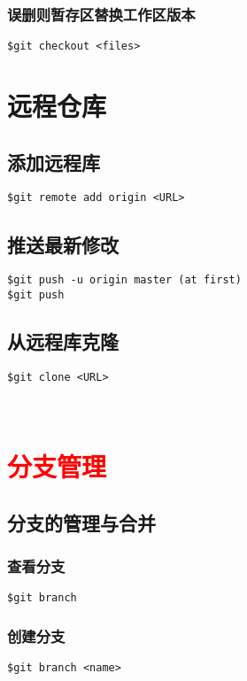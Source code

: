 \subsubsection{误删则暂存区替换工作区版本}
\begin{lstlisting}
$git checkout <files>
\end{lstlisting}

\section{远程仓库}
\subsection{添加远程库}
\begin{lstlisting}
$git remote add origin <URL>
\end{lstlisting}

\subsection{推送最新修改}
\begin{lstlisting}
$git push -u origin master (at first)
$git push
\end{lstlisting}

\subsection{从远程库克隆}
\begin{lstlisting}
$git clone <URL>
\end{lstlisting}

~\\
\section{\textcolor{red}{\textbf{分支管理}}}
\subsection{分支的管理与合并}
\subsubsection{查看分支}
\begin{lstlisting}
$git branch
\end{lstlisting}

\subsubsection{创建分支}
\begin{lstlisting}
$git branch <name>
\end{lstlisting}


